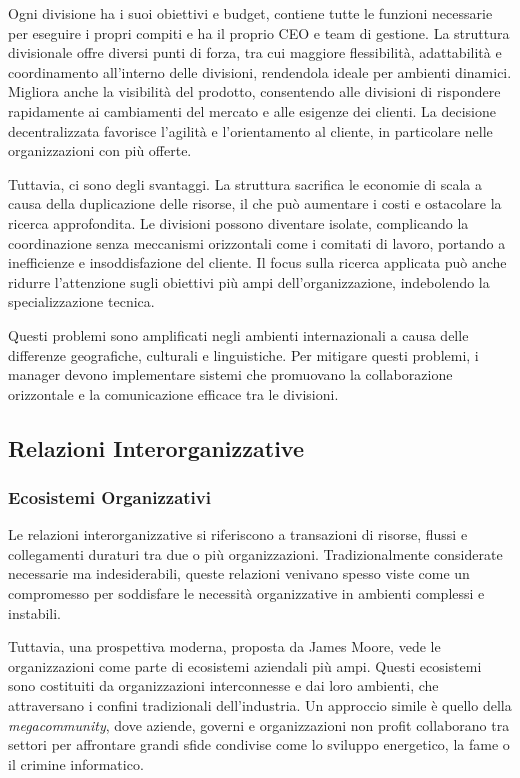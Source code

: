 \documentclass{article}
\begin{document}
Ogni divisione ha i suoi obiettivi e budget, contiene tutte le funzioni necessarie per eseguire i propri compiti e ha il proprio CEO e team di gestione. La struttura divisionale offre diversi punti di forza, tra cui maggiore flessibilità, adattabilità e coordinamento all'interno delle divisioni, rendendola ideale per ambienti dinamici. Migliora anche la visibilità del prodotto, consentendo alle divisioni di rispondere rapidamente ai cambiamenti del mercato e alle esigenze dei clienti. La decisione decentralizzata favorisce l'agilità e l'orientamento al cliente, in particolare nelle organizzazioni con più offerte.

Tuttavia, ci sono degli svantaggi. La struttura sacrifica le economie di scala a causa della duplicazione delle risorse, il che può aumentare i costi e ostacolare la ricerca approfondita. Le divisioni possono diventare isolate, complicando la coordinazione senza meccanismi orizzontali come i comitati di lavoro, portando a inefficienze e insoddisfazione del cliente. Il focus sulla ricerca applicata può anche ridurre l'attenzione sugli obiettivi più ampi dell'organizzazione, indebolendo la specializzazione tecnica.

Questi problemi sono amplificati negli ambienti internazionali a causa delle differenze geografiche, culturali e linguistiche. Per mitigare questi problemi, i manager devono implementare sistemi che promuovano la collaborazione orizzontale e la comunicazione efficace tra le divisioni.

\subsection{Relazioni Interorganizzative}

\subsubsection{Ecosistemi Organizzativi}

Le relazioni interorganizzative si riferiscono a transazioni di risorse, flussi e collegamenti duraturi tra due o più organizzazioni. Tradizionalmente considerate necessarie ma indesiderabili, queste relazioni venivano spesso viste come un compromesso per soddisfare le necessità organizzative in ambienti complessi e instabili.

Tuttavia, una prospettiva moderna, proposta da James Moore, vede le organizzazioni come parte di ecosistemi aziendali più ampi. Questi ecosistemi sono costituiti da organizzazioni interconnesse e dai loro ambienti, che attraversano i confini tradizionali dell'industria. Un approccio simile è quello della \textit{megacommunity}, dove aziende, governi e organizzazioni non profit collaborano tra settori per affrontare grandi sfide condivise come lo sviluppo energetico, la fame o il crimine informatico.
\end{document}
